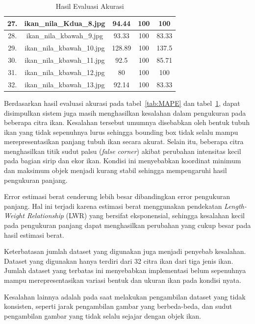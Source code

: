 \begin{table}[H]
\begin{tabular}{|c|c|c|c|c|}
        \hline
        27. & ikan\_nila\_Kdua\_8.jpg & 94.44 & 100 & 100 \\
        \hline
        28. & ikan\_nila\_kbawah\_9.jpg & 93.33 & 100 & 83.33 \\
        \hline
        29. & ikan\_nila\_kbawah\_10.jpg & 128.89 & 100 & 137.5 \\
        \hline
        30. & ikan\_nila\_kbawah\_11.jpg & 92.5 & 100 & 85.71 \\
        \hline
        31. & ikan\_nila\_kbawah\_12.jpg & 80 & 100 & 100 \\
        \hline
        32. & ikan\_nila\_kbawah\_13.jpg & 92.14 & 100 & 83.33 \\
        \hline
    \end{tabular}
    \caption{Hasil Evaluasi Akurasi}\label{tab:allEval}
\end{table}

Berdasarkan hasil evaluasi akurasi pada tabel~\ref{tab:MAPE} dan tabel~\ref{tab:allEval}, dapat disimpulkan sistem juga masih menghasilkan kesalahan dalam pengukuran pada beberapa citra ikan.
Kesalahan tersebut umumnya disebabkan oleh bentuk tubuh ikan yang tidak sepenuhnya lurus sehingga bounding box tidak selalu mampu merepresentasikan panjang tubuh ikan secara akurat.
Selain itu, beberapa citra menghasilkan titik sudut palsu (\emph{false corner}) akibat perubahan intensitas kecil pada bagian sirip dan ekor ikan. 
Kondisi ini menyebabkan koordinat minimum dan maksimum objek menjadi kurang stabil sehingga mempengaruhi hasil pengukuran panjang. 

Error estimasi berat cenderung lebih besar dibandingkan error pengukuran panjang. 
Hal ini terjadi karena estimasi berat menggunakan pendekatan \emph{Length-Weight Relationship} (LWR) yang bersifat eksponensial, sehingga kesalahan kecil pada pengukuran panjang dapat menghasilkan perubahan yang cukup besar pada hasil estimasi berat.

Keterbatasan jumlah dataset yang digunakan juga menjadi penyebab kesalahan. Dataset yang digunakan hanya terdiri dari 32 citra ikan dari tiga jenis ikan. 
Jumlah dataset yang terbatas ini menyebabkan implementasi belum sepenuhnya mampu merepresentasikan variasi bentuk dan ukuran ikan pada kondisi nyata.

Kesalahan lainnya adalah pada saat melakukan pengambilan dataset yang tidak konsisten, seperti jarak pengambilan gambar yang berbeda-beda, dan sudut pengambilan gambar yang tidak selalu sejajar dengan objek ikan.


